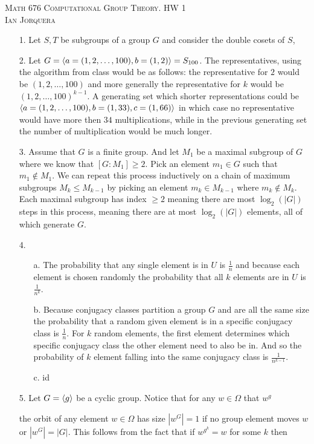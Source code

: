 \documentclass[12pt]{amsart}
\begin{document}
\begin{center}
   \textsc{Math 676 Computational Group Theory. HW 1\\ Ian Jorquera}
\end{center}
\vspace{1em}

\begin{itemize}
   \item[1.]
   Let $S,T$ be subgroups of a group $G$ and consider the double 
   cosets of $S$,

   \item[2.] Let $G=\left\langle a=(1,2,\dots,100), b= (1,2) \right\rangle=S_{100}$. The representatives, 
   using the algorithm from class would be as follows: the representative for $2$ would
    be $(1,2,\dots,100)$ and more generally the representative for $k$ would be
    $(1,2,\dots,100)^{k-1}$. A generating set which shorter representations could be 
    $\left\langle a=(1,2,\dots,100), b= (1,33), c=(1,66) \right\rangle$ in which case no representative would
    have more then $34$ multiplications, while in the previous generating set the 
    number of multiplication would be much longer.
   
    \item[3.] Assume that $G$ is a finite group. And let $M_1$ be a maximal subgroup of $G$
               where we know that $[G:M_1]\geq 2$. Pick an element $m_1\in G$ 
               such that $m_1\not\in M_1$. We can repeat this process inductively on a
               chain of maximum subgroups $M_{k}\leq M_{k-1}$ by
               picking an element $m_k\in M_{k-1}$ where $m_k\not\in M_k$. Each maximal subgroup has
               index $\geq 2$ meaning there are most $\log_2(|G|)$ steps in this process, 
               meaning there are at most $\log_2(|G|)$ elements, all of which generate $G$.

   \item[4.] 
   \begin{itemize}
      \item[a. ] The probability that any single element is in $U$ is $\frac{1}{n}$ and 
      because each element is chosen randomly the probability that all $k$ elements are in $U$
      is $\frac{1}{n^k}$.
      \item[b. ] Because conjugacy classes partition a group $G$ and are all the same size 
                 the probability that a random given element is in a specific conjugacy class
                 is $\frac{1}{n}$. For $k$ random elements, the first element determines which
                 specific conjugacy class the other element need to also be in. And so the 
                 probability of $k$ element falling into the same conjugacy class is $\frac{1}{n^{k-1}}$.
      \item[c. ]  id
   \end{itemize}
   \item[5.] Let $G=\left\langle g \right\rangle$ be a cyclic group. Notice that for any $w\in \Omega$  that $w^g$
   
            the orbit of any element $w\in\Omega$ has size $|w^G|=1$ 
            if no group element moves $w$ or $|w^G|=|G|$. This follows from the fact that 
            if $w^{g^k}=w$ for some $k$ then 

\end{itemize}

\end{document}
